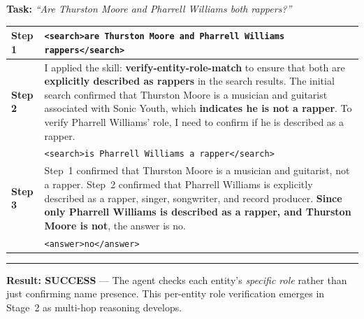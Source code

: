 \documentclass{article}
\theoremstyle{plain}
\theoremstyle{definition}
\theoremstyle{remark}
\begin{document}
\begin{tcolorbox}[
    colback=white, colframe=stage2color, width=\textwidth, sharp corners,
    boxrule=0.8pt, left=5pt, right=5pt, top=5pt, bottom=5pt,
    title=\textbf{Case 3 (Stage 2, Step 179): Role Verification --- verify-entity-role-match},
    fonttitle=\sffamily\small, colbacktitle=stage2color!10, coltitle=black
]
\small

\textbf{Task:} \textit{``Are Thurston Moore and Pharrell Williams both rappers?''}

\vspace{4pt}
\begin{tabularx}{\linewidth}{@{}p{1.0cm} X@{}}
    \textbf{Step 1} & \texttt{<search>are Thurston Moore and Pharrell Williams rappers</search>} \\
    \midrule
    \textbf{Step 2} & I applied the skill: \textbf{\textcolor{skillcolor}{verify-entity-role-match}} to ensure that both are \textbf{explicitly described as rappers} in the search results. The initial search confirmed that Thurston Moore is a musician and guitarist associated with Sonic Youth, which \textbf{indicates he is not a rapper}. To verify Pharrell Williams' role, I need to confirm if he is described as a rapper. \\
    & \texttt{<search>is Pharrell Williams a rapper</search>} \\
    \midrule
    \textbf{Step 3} & Step~1 confirmed that Thurston Moore is a musician and guitarist, not a rapper. Step~2 confirmed that Pharrell Williams is explicitly described as a rapper, singer, songwriter, and record producer. \textbf{Since only Pharrell Williams is described as a rapper, and Thurston Moore is not}, the answer is no. \\
    & \texttt{<answer>no</answer>} \\
\end{tabularx}

\vspace{3pt}\hrule\vspace{3pt}
\textbf{\textcolor{successgreen}{Result: SUCCESS}} --- The agent checks each entity's \textit{specific role} rather than just confirming name presence. This per-entity role verification emerges in Stage~2 as multi-hop reasoning develops.
\end{tcolorbox}

\vspace{4pt}
\end{document}
